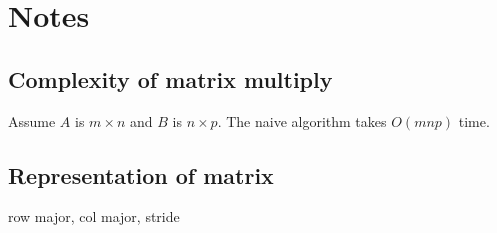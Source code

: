 \chapter{Notes} %
\label{chap:Notes}

\section{Complexity of matrix multiply} %
\label{sec:Complexity of matrix multiply}

Assume $A$ is $m\times n$ and $B$ is $n\times p$.
The naive algorithm takes $O\left(mnp\right)$ time.



\section{Representation of matrix} %
\label{sec:Representation of matrix}

row major, col major, stride



